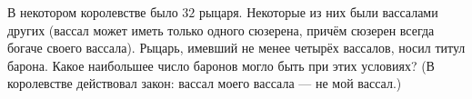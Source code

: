 В некотором королевстве было $32$ рыцаря. Некоторые из них были вассалами других (вассал может иметь только одного сюзерена, причём сюзерен всегда богаче своего вассала). Рыцарь, имевший не менее четырёх вассалов, носил титул барона. Какое наибольшее число баронов могло быть при этих условиях? (В королевстве действовал закон: \guillemotleft вассал моего вассала --- не мой вассал\guillemotright.)